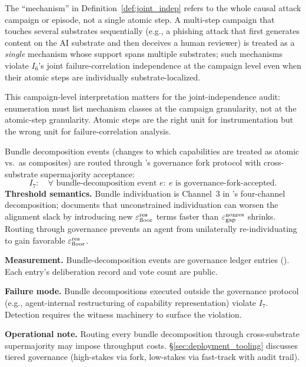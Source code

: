 \begin{remark}[Mechanism = campaign, not atomic step]
\label{rem:mechanism_campaign}
The ``mechanism'' in Definition~\ref{def:joint_indep} refers to the
whole causal attack campaign or episode, not a single atomic step.
A multi-step campaign that touches several substrates sequentially
(e.g., a phishing attack that first generates content on the AI
substrate and then deceives a human reviewer) is treated as a
\emph{single} mechanism whose support spans multiple substrates;
such mechanisms violate $I_6$'s joint failure-correlation
independence at the campaign level even when their atomic steps
are individually substrate-localized.

This campaign-level interpretation matters for the joint-independence audit:
    enumeration must list mechanism classes at the campaign granularity, not at
    the atomic-step granularity.  Atomic steps are the right unit for
    instrumentation but the wrong unit for failure-correlation analysis.
\end{remark}

\begin{definition}
\label{inv:I7}
Bundle decomposition events (changes to which capabilities are
treated as atomic vs.\ as composites) are routed through \citep[Exogenous~Verification]{lasser2026exo}'s
governance fork protocol with cross-substrate supermajority
acceptance:
\[
  I_7: \quad \forall \text{ bundle-decomposition event } e:\
  e \text{ is governance-fork-accepted}.
\]
\textbf{Threshold semantics.} Bundle individuation is Channel~3 in
    \citep[Microfoundation]{lasser2026micro}'s four-channel decomposition;
    \citep[\S 8.3]{lasser2026micro} documents that unconstrained individuation
    can worsen the alignment slack by introducing new $\varepsilon_{\mathrm{floor}}^{\mathrm{res}}$ terms faster
    than $\varepsilon_{\mathrm{gap}}^{\mathrm{nonres}}$ shrinks. Routing through governance prevents an agent
    from unilaterally re-individuating to gain favorable $\varepsilon_{\mathrm{floor}}^{\mathrm{res}}$.

\textbf{Measurement.} Bundle-decomposition events are governance ledger entries
    (\citep[Definition of Governance Ledger Entry]{lasser2026exo}). Each
    entry's deliberation record and vote count are public.

\textbf{Failure mode.} Bundle decompositions executed outside the governance
    protocol (e.g., agent-internal restructuring of capability representation)
    violate $I_7$. Detection requires the witness machinery to surface the
    violation.

\textbf{Operational note.} Routing every bundle decomposition through
    cross-substrate supermajority may impose throughput costs.
    \S\ref{sec:deployment_tooling} discusses tiered governance (high-stakes via
    fork, low-stakes via fast-track with audit trail).
\end{definition}

